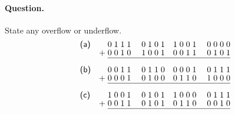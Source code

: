 \paragraph{Question.} State any overflow or underflow.
\[
\renewcommand\arraystretch{0.85}
\begin{array}{lr@{\;}c@{\;}c@{\;}c@{\;}c@{\;}cc@{\;}c@{\;}c@{\;}cc@{}c@{\;}c@{\;}c@{\;}c@{\;}cc@{\;}c@{\;}c@{\;}c@{}}
\textsf{(a)} &   & 0&1&1&1 & & 0&1&0&1 & & 1&0&0&1 & & 0&0&0&0\\
             & + & 0&0&1&0 & & 1&0&0&1 & & 0&0&1&1 & & 0&1&0&1\\
\cline{3-21}\\
\textsf{(b)} &   & 0&0&1&1 & & 0&1&1&0 & & 0&0&0&1 & & 0&1&1&1\\
             & + & 0&0&0&1 & & 0&1&0&0 & & 0&1&1&0 & & 1&0&0&0\\
\cline{3-21}\\
\textsf{(c)} &   & 1&0&0&1 & & 0&1&0&1 & & 1&0&0&0 & & 0&1&1&1\\
             & + & 0&0&1&1 & & 0&1&0&1 & & 0&1&1&0 & & 0&0&1&0\\
\cline{3-21}\\
\end{array}
\]

